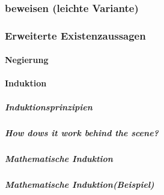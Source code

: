         \subsubsection{beweisen (leichte Variante)}
        \subsubsection{Erweiterte Existenzaussagen}
        \paragraph{Negierung}
        \paragraph{Induktion}
        \subparagraph{Induktionsprinzipien}
        \subparagraph{How dows it work behind the scene?}
        \subparagraph{Mathematische Induktion}
        \subparagraph*{Mathematische Induktion(Beispiel)}